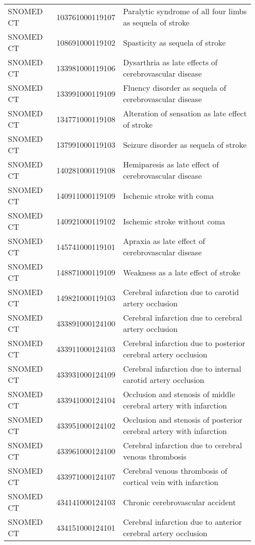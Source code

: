 \begin{longtable}{p{}p{}p{}}
  SNOMED CT & 103761000119107 & Paralytic syndrome of all four limbs as sequela of stroke \\ 
  SNOMED CT & 108691000119102 & Spasticity as sequela of stroke \\ 
  SNOMED CT & 133981000119106 & Dysarthria as late effects of cerebrovascular disease \\ 
  SNOMED CT & 133991000119109 & Fluency disorder as sequela of cerebrovascular disease \\ 
  SNOMED CT & 134771000119108 & Alteration of sensation as late effect of stroke \\ 
  SNOMED CT & 137991000119103 & Seizure disorder as sequela of stroke \\ 
  SNOMED CT & 140281000119108 & Hemiparesis as late effect of cerebrovascular disease \\ 
  SNOMED CT & 140911000119109 & Ischemic stroke with coma \\ 
  SNOMED CT & 140921000119102 & Ischemic stroke without coma \\ 
  SNOMED CT & 145741000119101 & Apraxia as late effect of cerebrovascular disease \\ 
  SNOMED CT & 148871000119109 & Weakness as a late effect of stroke \\ 
  SNOMED CT & 149821000119103 & Cerebral infarction due to carotid artery occlusion \\ 
  SNOMED CT & 433891000124100 & Cerebral infarction due to cerebral artery occlusion \\ 
  SNOMED CT & 433911000124103 & Cerebral infarction due to posterior cerebral artery occlusion \\ 
  SNOMED CT & 433931000124109 & Cerebral infarction due to internal carotid artery occlusion \\ 
  SNOMED CT & 433941000124104 & Occlusion and stenosis of middle cerebral artery with infarction \\ 
  SNOMED CT & 433951000124102 & Occlusion and stenosis of posterior cerebral artery with infarction \\ 
  SNOMED CT & 433961000124100 & Cerebral infarction due to cerebral venous thrombosis \\ 
  SNOMED CT & 433971000124107 & Cerebral venous thrombosis of cortical vein with infarction \\ 
  SNOMED CT & 434141000124103 & Chronic cerebrovascular accident \\ 
  SNOMED CT & 434151000124101 & Cerebral infarction due to anterior cerebral artery occlusion \\ 

\end{longtable}
